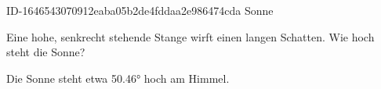 \begin{exercise}
      {ID-1646543070912eaba05b2de4fddaa2e986474cda}
      {Sonne}
  \ifproblem\problem\par
    Eine  hohe, senkrecht stehende Stange wirft einen
     langen Schatten. Wie hoch steht die Sonne?
  \fi
  \ifoutcome\outcome\par
    Die Sonne steht etwa \ang{50.46} hoch am Himmel.
  \fi
\end{exercise}
